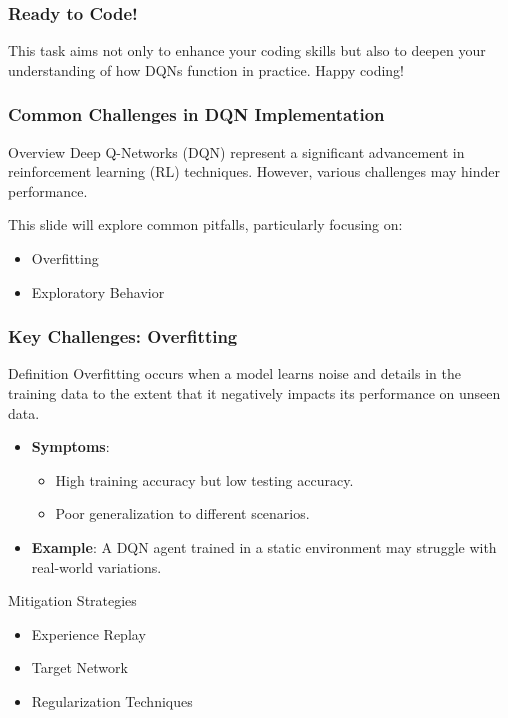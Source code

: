 \documentclass{beamer}
\begin{document}
\begin{frame}
    \frametitle{Ready to Code!}
    This task aims not only to enhance your coding skills but also to deepen your understanding of how DQNs function in practice. Happy coding!
\end{frame}

\begin{frame}[fragile]
    \frametitle{Common Challenges in DQN Implementation}
    \begin{block}{Overview}
        Deep Q-Networks (DQN) represent a significant advancement in reinforcement learning (RL) techniques. However, various challenges may hinder performance.
    \end{block}
    This slide will explore common pitfalls, particularly focusing on:
    \begin{itemize}
        \item Overfitting
        \item Exploratory Behavior
    \end{itemize}
\end{frame}

\begin{frame}[fragile]
    \frametitle{Key Challenges: Overfitting}
    \begin{block}{Definition}
        Overfitting occurs when a model learns noise and details in the training data to the extent that it negatively impacts its performance on unseen data.
    \end{block}
    \begin{itemize}
        \item \textbf{Symptoms}:
        \begin{itemize}
            \item High training accuracy but low testing accuracy.
            \item Poor generalization to different scenarios.
        \end{itemize}
        \item \textbf{Example}: A DQN agent trained in a static environment may struggle with real-world variations.
    \end{itemize}
    
    \begin{block}{Mitigation Strategies}
        \begin{itemize}
            \item Experience Replay
            \item Target Network
            \item Regularization Techniques
        \end{itemize}
    \end{block}
\end{frame}
\end{document}
